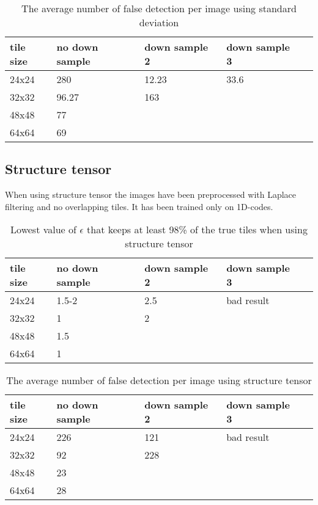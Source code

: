 \begin{table}[H]
\begin{center}
     \begin{tabular}{ | l | l | l | l | l |}
     \hline
     tile size & no down sample & down sample 2 & down sample 3 \\ \hline
   	 24x24 & 280 & 12.23 & 33.6 	\\ \hline
     32x32 & 96.27 & 163 & 			\\ \hline
     48x48 & 77    &     &  		\\ \hline
     64x64 & 69     &     &			\\ \hline
     \end{tabular}
\end{center}
\caption{The average number of false detection per image using standard deviation}
\end{table}

\subsection{Structure tensor}
When using structure tensor the images have been preprocessed with Laplace filtering and no overlapping tiles. It has been trained only on 1D-codes. 

\begin{table}[H]
\begin{center}
     \begin{tabular}{ | l | l | l | l | l |}
     \hline
     tile size & no down sample & down sample 2 & down sample 3 \\ \hline
   	 24x24 & 1.5-2 & 2.5 & bad result 	\\ \hline
     32x32 & 1 & 2  & 					\\ \hline
     48x48 & 1.5 &     &  				\\ \hline
     64x64 & 1 &     &					\\ \hline
     \end{tabular}
\end{center}
\caption{Lowest value of $\epsilon$ that keeps at least 98\% of the true tiles when using structure tensor}
\end{table}

\begin{table}[H]
\begin{center}
     \begin{tabular}{ | l | l | l | l | l |}
     \hline
     tile size & no down sample & down sample 2 & down sample 3 \\ \hline
   	 24x24 & 226 & 121 & bad result 	\\ \hline
     32x32 & 92 & 228 & 				\\ \hline
     48x48 & 23    &     &  			\\ \hline
     64x64 & 28     &     &				\\ \hline
     \end{tabular}
\end{center}
\caption{The average number of false detection per image using structure tensor}
\end{table}

